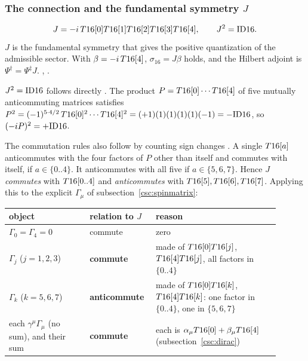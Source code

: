 \subsubsection{The connection and the fundamental symmetry \texorpdfstring{$J$}{J}}
\label{sec:9.12.6}

\begin{equation}
  J=-i\,T16[0]T16[1]T16[2]T16[3]T16[4],\qquad J^2=\mathrm{ID16} .
\end{equation}
$J$ is the fundamental symmetry that gives the positive quantization of the admissible sector.
With $\beta=-i\,T16[4]$, $\sigma_{16}=J\beta$ holds, and the Hilbert adjoint is
$\Psi^\dagger=\Psi^\ddagger J$.  , .

$J^2=\mathrm{ID16}$ follows directly \cfderived. The product $P=T16[0]\cdots T16[4]$ of five mutually
anticommuting matrices satisfies
$P^2=(-1)^{5\cdot4/2}\,T16[0]^2\cdots T16[4]^2=(+1)(1)(1)(1)(1)(-1)=-\mathrm{ID16}$, so
$(-iP)^2=+\mathrm{ID16}$.

The commutation rules also follow by counting sign changes \cfderived. A single $T16[a]$
anticommutes with the four factors of $P$ other than itself and commutes with itself, if
$a\in\{0..4\}$. It anticommutes with all five if $a\in\{5,6,7\}$. Hence $J$ \emph{commutes} with
$T16[0..4]$ and \emph{anticommutes} with $T16[5],T16[6],T16[7]$. Applying this to the
explicit $\Gamma_\mu$ of subsection~\ref{csc:spinmatrix}:

\begin{center}
{\small
\begin{tabular}{@{}p{0.28\linewidth}p{0.19\linewidth}p{0.43\linewidth}@{}}
\toprule
\raggedright object & \raggedright relation to $J$ & \raggedright reason \tabularnewline
\midrule
\raggedright $\Gamma_0=\Gamma_4=0$ & \raggedright commute & \raggedright zero \tabularnewline
\raggedright $\Gamma_j$ ($j=1,2,3$) & \raggedright \textbf{commute} & \raggedright made of $T16[0]T16[j]$, $T16[4]T16[j]$, all factors in $\{0..4\}$ \tabularnewline
\raggedright $\Gamma_k$ ($k=5,6,7$) & \raggedright \textbf{anticommute} & \raggedright made of $T16[0]T16[k]$, $T16[4]T16[k]$: one factor in $\{0..4\}$, one in $\{5,6,7\}$ \tabularnewline
\raggedright each $\gamma^\mu\Gamma_\mu$ (no sum), and their sum & \raggedright \textbf{commute} & \raggedright each is $\alpha_\mu T16[0]+\beta_\mu T16[4]$ (subsection~\ref{csc:dirac}) \tabularnewline
\bottomrule
\end{tabular}
}
\end{center}

